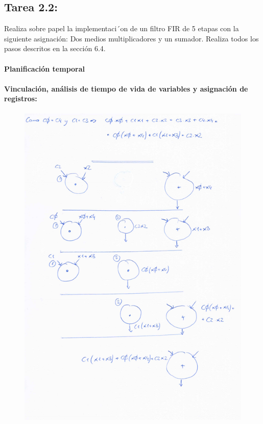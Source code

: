 \documentclass{article}
\begin{document}
\newpage
\subsection{Tarea 2.2:}
Realiza sobre papel la implementaci´on de un filtro FIR de 5 etapas con la siguiente asignación: Dos medios multiplicadores y un sumador. Realiza todos los pasos descritos en la sección 6.4.

\paragraph{ Planificación temporal}



\paragraph{Vinculación, análisis de tiempo de vida de variables y asignación de registros:}

\begin{figure}[H]
\centering
\includegraphics[width=0.85\linewidth]{images/2_2_1.png}
\end{figure}
\end{document}
